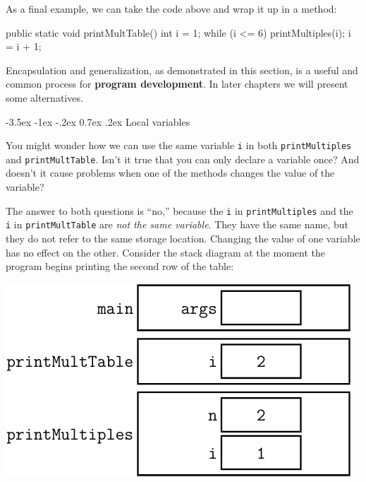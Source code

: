 \documentclass[12pt]{book}
\makeatletter
\theoremstyle{exercise}
\newcommand{\java}[1]{\verb"#1"}
\renewcommand{\section}{\@startsection{section}{1}{\z@}%
    {-3.5ex \@plus -1ex \@minus -.2ex}%
    {0.7ex \@plus.2ex}%
    {\normalfont\Large\bfseries}}
\newcommand{\java}[1]{\lstinline{#1}} %
\makeatother
\begin{document}
As a final example, we can take the code above and wrap it up in a method:

\begin{code}
    public static void printMultTable() {
        int i = 1;
        while (i <= 6) {
            printMultiples(i);
            i = i + 1;
        }
    }
\end{code}


Encapsulation and generalization, as demonstrated in this section, is a useful and common process for {\bf program development}.
In later chapters we will present some alternatives.


\section{Local variables}

You might wonder how we can use the same variable \java{i} in both \java{printMultiples} and \java{printMultTable}.
Isn't it true that you can only declare a variable once?
And doesn't it cause problems when one of the methods changes the value of the variable?

The answer to both questions is ``no,'' because the \java{i} in \java{printMultiples} and the \java{i} in \java{printMultTable} are {\em not the same variable}.
They have the same name, but they do not refer to the same storage location.
Changing the value of one variable has no effect on the other.
Consider the stack diagram at the moment the program begins printing the second row of the table:

\begin{center}
\vspace{1em}
\includegraphics{figs/stack4.pdf}
\vspace{1em}
\end{center}
\end{document}
